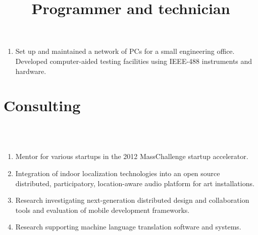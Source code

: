 \documentclass[line]{res}
\begin{document}
\begin{resume}
\begin{enumerate}
		\item {} 
		\title{Programmer and technician} 
		  
		\begin{position}
			Set up and maintained a network of PCs for a small engineering office. Developed computer-aided testing facilities using IEEE-488 instruments and hardware. 
		\end{position}
	\end{enumerate}
	
	\section{\sc Consulting}
	\begin{format}
		\\
		\body\\
	\end{format}
	\begin{enumerate}

		\item	{}
		\begin{position}
			Mentor for various startups in the 2012 MassChallenge startup accelerator.
		\end{position}
		
		\item {}
		\begin{position}
			Integration of indoor localization technologies into an open source distributed, participatory, location-aware audio platform for art installations.
		\end{position}
		
		\item {}
		\begin{position}
			Research investigating next-generation distributed design and collaboration tools and evaluation of mobile development frameworks.
		\end{position}
		
		\item {} 
		\begin{position}
			Research supporting machine language translation software and systems. 
		\end{position}
		

\end{enumerate}
\end{resume}
\end{document}
